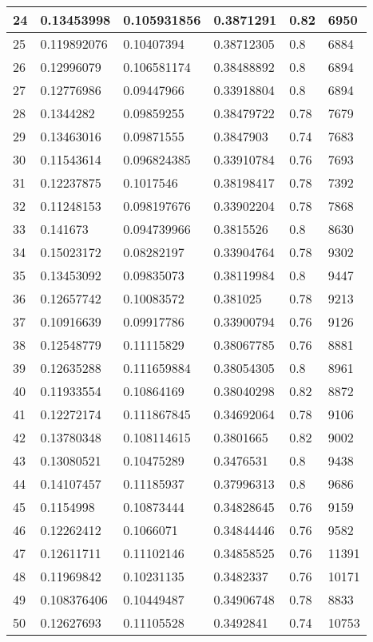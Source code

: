 \begin{longtable}{|l|l|l|l|l|l|}
24 & 0.13453998 & 0.105931856 & 0.3871291 & 0.82 & 6950 \\ \hline 
25 & 0.119892076 & 0.10407394 & 0.38712305 & 0.8 & 6884 \\ \hline 
26 & 0.12996079 & 0.106581174 & 0.38488892 & 0.8 & 6894 \\ \hline 
27 & 0.12776986 & 0.09447966 & 0.33918804 & 0.8 & 6894 \\ \hline 
28 & 0.1344282 & 0.09859255 & 0.38479722 & 0.78 & 7679 \\ \hline 
29 & 0.13463016 & 0.09871555 & 0.3847903 & 0.74 & 7683 \\ \hline 
30 & 0.11543614 & 0.096824385 & 0.33910784 & 0.76 & 7693 \\ \hline 
31 & 0.12237875 & 0.1017546 & 0.38198417 & 0.78 & 7392 \\ \hline 
32 & 0.11248153 & 0.098197676 & 0.33902204 & 0.78 & 7868 \\ \hline 
33 & 0.141673 & 0.094739966 & 0.3815526 & 0.8 & 8630 \\ \hline 
34 & 0.15023172 & 0.08282197 & 0.33904764 & 0.78 & 9302 \\ \hline 
35 & 0.13453092 & 0.09835073 & 0.38119984 & 0.8 & 9447 \\ \hline 
36 & 0.12657742 & 0.10083572 & 0.381025 & 0.78 & 9213 \\ \hline 
37 & 0.10916639 & 0.09917786 & 0.33900794 & 0.76 & 9126 \\ \hline 
38 & 0.12548779 & 0.11115829 & 0.38067785 & 0.76 & 8881 \\ \hline 
39 & 0.12635288 & 0.111659884 & 0.38054305 & 0.8 & 8961 \\ \hline 
40 & 0.11933554 & 0.10864169 & 0.38040298 & 0.82 & 8872 \\ \hline 
41 & 0.12272174 & 0.111867845 & 0.34692064 & 0.78 & 9106 \\ \hline 
42 & 0.13780348 & 0.108114615 & 0.3801665 & 0.82 & 9002 \\ \hline 
43 & 0.13080521 & 0.10475289 & 0.3476531 & 0.8 & 9438 \\ \hline 
44 & 0.14107457 & 0.11185937 & 0.37996313 & 0.8 & 9686 \\ \hline 
45 & 0.1154998 & 0.10873444 & 0.34828645 & 0.76 & 9159 \\ \hline 
46 & 0.12262412 & 0.1066071 & 0.34844446 & 0.76 & 9582 \\ \hline 
47 & 0.12611711 & 0.11102146 & 0.34858525 & 0.76 & 11391 \\ \hline 
48 & 0.11969842 & 0.10231135 & 0.3482337 & 0.76 & 10171 \\ \hline 
49 & 0.108376406 & 0.10449487 & 0.34906748 & 0.78 & 8833 \\ \hline 
50 & 0.12627693 & 0.11105528 & 0.3492841 & 0.74 & 10753 \\ \hline 
\end{longtable}
